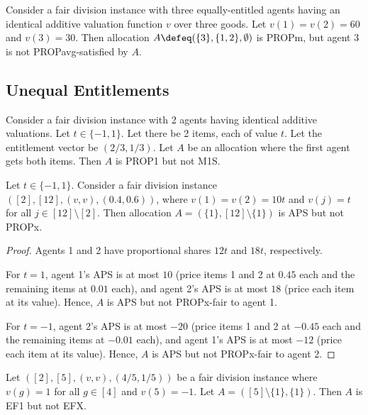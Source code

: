 \begin{example}
\label{cex:propm-not-propavg}
Consider a fair division instance with three equally-entitled agents
having an identical additive valuation function $v$ over three goods.
Let $v(1) = v(2) = 60$ and $v(3) = 30$.
Then allocation $A \defeq (\{3\}, \{1, 2\}, \emptyset)$ is PROPm,
but agent 3 is not PROPavg-satisfied by $A$.
\end{example}

\subsection{Unequal Entitlements}
\label{sec:cex-extra:uneqEnt}

\begin{example}
\label{cex:prop1-not-m1s-n2}
Consider a fair division instance with 2 agents having identical additive valuations.
Let $t \in \{-1, 1\}$. Let there be 2 items, each of value $t$.
Let the entitlement vector be $(2/3, 1/3)$.
Let $A$ be an allocation where the first agent gets both items.
Then $A$ is PROP1 but not M1S.
\end{example}

\begin{lemma}[GAPS $\nfimplies$ PROPx for $n=2$]
\label{cex:gaps-not-propx-n2}
Let $t \in \{-1, 1\}$. Consider a fair division instance $([2], [12], (v, v), (0.4, 0.6))$,
where $v(1) = v(2) = 10t$ and $v(j) = t$ for all $j \in [12] \setminus [2]$.
Then allocation $A = (\{1\}, [12] \setminus \{1\})$ is APS but not PROPx.
\end{lemma}
\begin{proof}
Agents 1 and 2 have proportional shares $12t$ and $18t$, respectively.

For $t = 1$, agent 1's APS is at most $10$
(price items 1 and 2 at $0.45$ each and the remaining items at $0.01$ each),
and agent 2's APS is at most $18$ (price each item at its value).
Hence, $A$ is APS but not PROPx-fair to agent 1.

For $t = -1$, agent 2's APS is at most $-20$
(price items 1 and 2 at $-0.45$ each and the remaining items at $-0.01$ each),
and agent 1's APS is at most $-12$ (price each item at its value).
Hence, $A$ is APS but not PROPx-fair to agent 2.
\end{proof}

\begin{example}
\label{cex:ef1-not-efx-mixed-ue}
Let $([2], [5], (v, v), (4/5, 1/5))$ be a fair division instance
where $v(g) = 1$ for all $g \in [4]$ and $v(5) = -1$.
Let $A = ([5] \setminus \{1\}, \{1\})$. Then $A$ is EF1 but not EFX.
\end{example}

